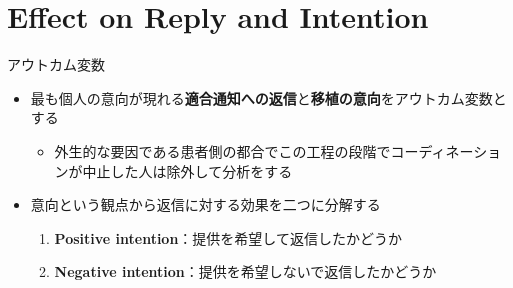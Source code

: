 \documentclass[
      aspectratio=169,
        12pt,
    ]{beamer}
\renewcommand{\textbf}[1]{{\color{DarkBlue}\bfseries#1}}
\providecommand{\tightlist}{%
  \setlength{\itemsep}{0pt}\setlength{\parskip}{0pt}}
\begin{document}
\hypertarget{effect-on-reply-and-intention}{%
\section{Effect on Reply and Intention}\label{effect-on-reply-and-intention}}

\begin{frame}{アウトカム変数}
\protect\hypertarget{ux30a2ux30a6ux30c8ux30abux30e0ux5909ux6570}{}
\begin{itemize}
\tightlist
\item
  最も個人の意向が現れる\textbf{適合通知への返信}と\textbf{移植の意向}をアウトカム変数とする

  \begin{itemize}
  \tightlist
  \item
    外生的な要因である患者側の都合でこの工程の段階でコーディネーションが中止した人は除外して分析をする
  \end{itemize}
\item
  意向という観点から返信に対する効果を二つに分解する

  \begin{enumerate}
  \tightlist
  \item
    \textbf{Positive intention}：提供を希望して返信したかどうか
  \item
    \textbf{Negative intention}：提供を希望しないで返信したかどうか
  \end{enumerate}
\end{itemize}
\end{frame}
\end{document}
